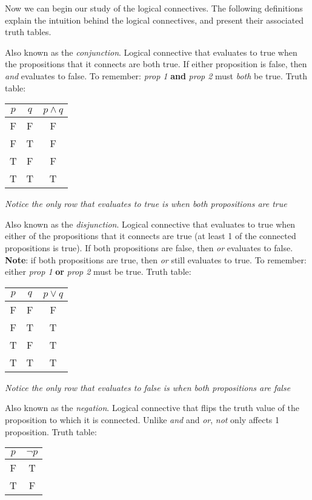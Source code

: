 \documentclass[main.tex]{subfiles}
\begin{document}
Now we can begin our study of the logical connectives. The following definitions explain the intuition behind the logical connectives, and present their associated truth tables.

\begin{defn}
	Also known as the \textit{conjunction}. Logical connective that evaluates to true when the propositions that it connects are both true. If either proposition is false, then \textit{and} evaluates to false. To remember: \textit{prop 1} \textbf{and} \textit{prop 2} must \textit{both} be true. Truth table:
	\begin{center}
		\begin{tabular}{c|c|c}
			\(p\) & \(q\) & \(p \land q\) \\
			\hline
			F & F & F \\
			F & T & F \\
			T & F & F \\
			T & T & T
		\end{tabular}
	\end{center}
	
	\textit{Notice the only row that evaluates to true is when both propositions are true}
\end{defn}

\begin{defn}[Or \(\lor\)]
	Also known as the \textit{disjunction}. Logical connective that evaluates to true when either of the propositions that it connects are true (at least 1 of the connected propositions is true). If both propositions are false, then \textit{or} evaluates to false. \textbf{Note}: if both propositions are true, then \textit{or} still evaluates to true. To remember: either \textit{prop 1} \textbf{or} \textit{prop 2} must be true. Truth table:
	\begin{center}
		\begin{tabular}{c|c|c}
			\(p\) & \(q\) & \(p \lor q\) \\
			\hline
			F & F & F \\
			F & T & T \\
			T & F & T \\
			T & T & T
		\end{tabular}
	\end{center}
	
	\textit{Notice the only row that evaluates to false is when both propositions are false}
\end{defn}

\begin{defn}
	Also known as the \textit{negation}. Logical connective that flips the truth value of the proposition to which it is connected. Unlike \textit{and} and \textit{or}, \textit{not} only affects 1 proposition. Truth table:
	\begin{center}
		\begin{tabular}{c|c}
			\(p\) & \(\lnot p\) \\
			\hline
			F & T \\
			T & F \\
		\end{tabular}
	\end{center}
\end{defn}
\end{document}
